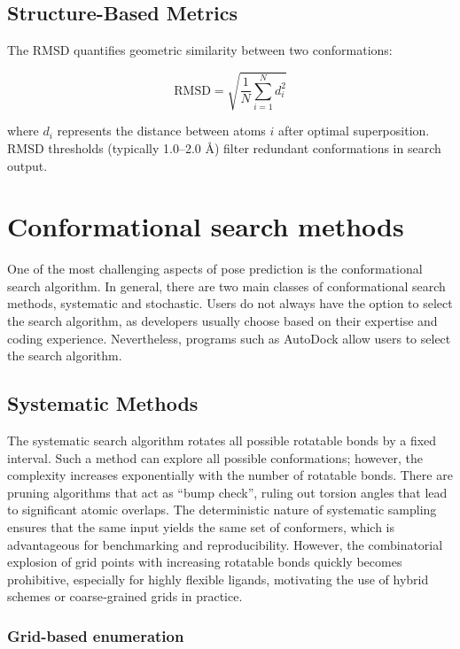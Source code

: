 \documentclass[12pt]{article}
\begin{document}
\subsection{Structure-Based Metrics}
The RMSD quantifies geometric similarity between two conformations:

\begin{equation}
    \text{RMSD} = \sqrt{\frac{1}{N} \sum_{i=1}^{N} d_i^2}
\label{eq:rmsd}
\end{equation}

where $d_i$ represents the distance between atoms $i$ after optimal superposition. RMSD thresholds (typically 1.0–2.0 \r{A}) filter redundant conformations in search output.

\section{Conformational search methods}
One of the most challenging aspects of pose prediction is the conformational search algorithm. In general, there are two main classes of conformational search methods, systematic and stochastic.  Users do not always have the option to select the search algorithm, as developers usually choose based on their expertise and coding experience. Nevertheless, programs such as AutoDock allow users to select the search algorithm.

\subsection{Systematic Methods}
The systematic search algorithm rotates all possible rotatable bonds by a fixed interval. Such a method can explore all possible conformations; however, the complexity increases exponentially with the number of rotatable bonds. There are pruning algorithms that act as “bump check”, ruling out torsion angles that lead to significant atomic overlaps. The deterministic nature of systematic sampling ensures that the same input yields the same set of conformers, which is advantageous for benchmarking and reproducibility. However, the combinatorial explosion of grid points with increasing rotatable bonds quickly becomes prohibitive, especially for highly flexible ligands, motivating the use of hybrid schemes or coarse‑grained grids in practice\cite{CH2_Beusen1996,CH2_Leach2001}.

\subsubsection{Grid-based enumeration}
\end{document}
